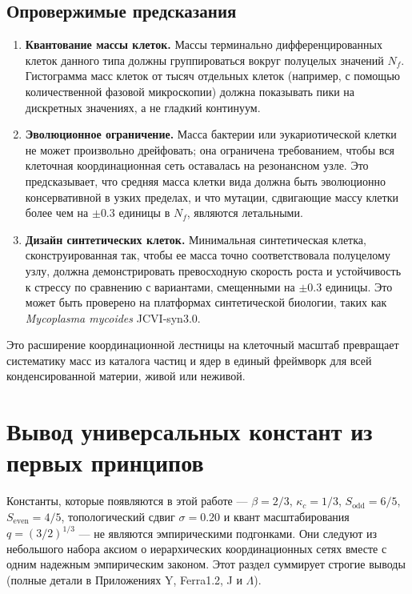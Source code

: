 \documentclass[11pt,a4paper]{article}
\begin{document}
	\subsection{Опровержимые предсказания}
	\begin{enumerate}
		\item \textbf{Квантование массы клеток.} Массы терминально дифференцированных клеток данного типа должны группироваться вокруг полуцелых значений \(N_f\). Гистограмма масс клеток от тысяч отдельных клеток (например, с помощью количественной фазовой микроскопии) должна показывать пики на дискретных значениях, а не гладкий континуум.
		\item \textbf{Эволюционное ограничение.} Масса бактерии или эукариотической клетки не может произвольно дрейфовать; она ограничена требованием, чтобы вся клеточная координационная сеть оставалась на резонансном узле. Это предсказывает, что средняя масса клетки вида должна быть эволюционно консервативной в узких пределах, и что мутации, сдвигающие массу клетки более чем на \(\pm 0.3\) единицы в \(N_f\), являются летальными.
		\item \textbf{Дизайн синтетических клеток.} Минимальная синтетическая клетка, сконструированная так, чтобы ее масса точно соответствовала полуцелому узлу, должна демонстрировать превосходную скорость роста и устойчивость к стрессу по сравнению с вариантами, смещенными на \(\pm 0.3\) единицы. Это может быть проверено на платформах синтетической биологии, таких как \textit{Mycoplasma mycoides} JCVI‑syn3.0.
	\end{enumerate}
	
	Это расширение координационной лестницы на клеточный масштаб превращает систематику масс из каталога частиц и ядер в единый фреймворк для всей конденсированной материи, живой или неживой.
	
	\section{Вывод универсальных констант из первых принципов}
	\label{sec:first-principles}
	
	Константы, которые появляются в этой работе — \(\beta = 2/3\), \(\kappa_c = 1/3\), \(S_{\mathrm{odd}}=6/5\), \(S_{\mathrm{even}}=4/5\), топологический сдвиг \(\sigma = 0.20\) и квант масштабирования \(q = (3/2)^{1/3}\) — не являются эмпирическими подгонками. Они следуют из небольшого набора аксиом о иерархических координационных сетях вместе с одним надежным эмпирическим законом. Этот раздел суммирует строгие выводы (полные детали в Приложениях Y, Ferra1.2, J и \(\Lambda\)).
	
\end{document}
